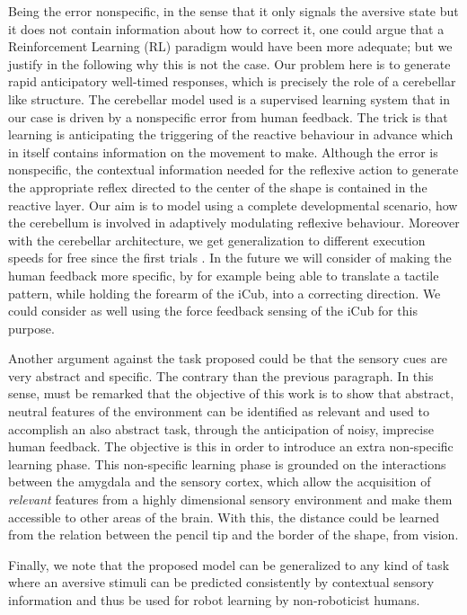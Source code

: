\documentclass[letterpaper, 10 pt, conference]{ieeeconf}  %
\begin{document}
Being the error nonspecific, in the sense that it only signals the aversive state but it does not contain information about how to correct it, one could argue that a Reinforcement Learning (RL) paradigm would have been more adequate; but we justify in the following why this is not the case. Our problem here is to generate rapid anticipatory well-timed responses, which is precisely the role of a cerebellar like structure.
The cerebellar model used \cite{herreros2013nucleo} is a supervised learning system that in our case is driven by a nonspecific error from human feedback. The trick is that learning is anticipating the triggering of the reactive behaviour in advance which in itself contains information on the movement to make. Although the error is nonspecific, the contextual information needed for the reflexive action to generate the appropriate reflex directed to the center of the shape is contained in the reactive layer. Our aim is to model using a complete developmental scenario, how the cerebellum is involved in adaptively modulating reflexive behaviour. Moreover with the cerebellar architecture, we get generalization to different execution speeds for free since the first trials \cite{herreros2013speed}.  
In the future we will consider of making the human feedback more specific, by for example being able to translate a tactile pattern, while holding the forearm of the iCub, into a correcting direction. We could consider as well using the force feedback sensing of the iCub for this purpose.

Another argument against the task proposed could be that the sensory cues are very abstract and specific. The contrary than the previous paragraph. In this sense, must be remarked that the objective of this work is to show that abstract, neutral features of the environment can be identified as relevant and used to accomplish an also abstract task, through the anticipation of noisy, imprecise human feedback. The objective is this in order to introduce an extra non-specific learning phase. This non-specific learning phase is grounded on the interactions between the amygdala and the sensory cortex, which allow the acquisition of \emph{relevant} features from a highly dimensional sensory environment and make them accessible to other areas of the brain. With this, the distance could be learned from the relation between the pencil tip and the border of the shape, from vision. 

Finally, we note that the proposed model can be generalized to any kind of task where an aversive stimuli can be predicted consistently by contextual sensory information and thus be used for robot learning by non-roboticist humans.
\end{document}

